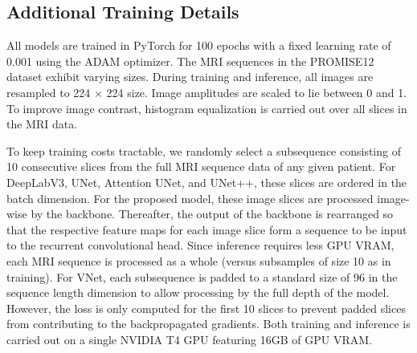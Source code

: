 \documentclass[journal]{IEEEtran}
\begin{document}
\ifCLASSOPTIONcaptionsoff
  \newpage
\fi








\appendix
\subsection*{Additional Training Details}
\label{app:training}
All models are trained in PyTorch for 100 epochs with a fixed learning rate of 0.001 using the ADAM optimizer. The MRI sequences in the PROMISE12 dataset exhibit varying sizes. During training and inference, all images are resampled to 224 $\times$ 224 size. Image amplitudes are scaled to lie between 0 and 1. To improve image contrast, histogram equalization is carried out over all slices in the MRI data. 

To keep training costs tractable, we randomly select a subsequence consisting of 10 consecutive slices from the full MRI sequence data of any given patient. For DeepLabV3, UNet, Attention UNet, and UNet++, these slices are ordered in the batch dimension. For the proposed model, these image slices are processed image-wise by the backbone. Thereafter, the output of the backbone is rearranged so that the respective feature maps for each image slice form a sequence to be input to the recurrent convolutional head. Since inference requires less GPU VRAM, each MRI sequence is processed as a whole (versus subsamples of size 10 as in training). For VNet, each subsequence is padded to a standard size of 96 in the sequence length dimension to allow processing by the full depth of the model. However, the loss is only computed for the first 10 slices to prevent padded slices from contributing to the backpropagated gradients.   Both training and inference is carried out on a single NVIDIA T4 GPU featuring 16GB of GPU VRAM.  
\end{document}
